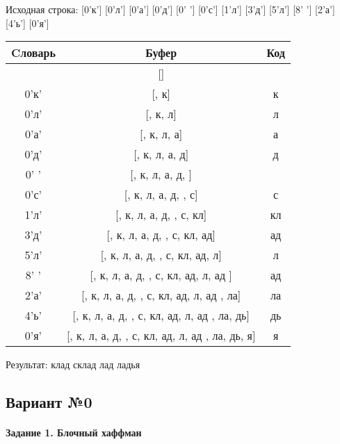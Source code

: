 \documentclass[a4paper, 12pt]{article}
\begin{document}
Исходная строка: [0'к'] [0'л'] [0'а'] [0'д'] [0' '] [0'с'] [1'л'] [3'д'] [5'л'] [8' '] [2'а'] [4'ь'] [0'я']\\
\begin{table}[h!]
\centering
\begin{tabular}{|c|c|c|}
\hline
 Cловарь & Буфер & Код  \\ \hline
 & [] & 
\\ \hline
0'к' & [, к] & к
\\ \hline
0'л' & [, к, л] & л
\\ \hline
0'а' & [, к, л, а] & а
\\ \hline
0'д' & [, к, л, а, д] & д
\\ \hline
0' ' & [, к, л, а, д,  ] &  
\\ \hline
0'с' & [, к, л, а, д,  , с] & с
\\ \hline
1'л' & [, к, л, а, д,  , с, кл] & кл
\\ \hline
3'д' & [, к, л, а, д,  , с, кл, ад] & ад
\\ \hline
5'л' & [, к, л, а, д,  , с, кл, ад,  л] &  л
\\ \hline
8' ' & [, к, л, а, д,  , с, кл, ад,  л, ад ] & ад 
\\ \hline
2'а' & [, к, л, а, д,  , с, кл, ад,  л, ад , ла] & ла
\\ \hline
4'ь' & [, к, л, а, д,  , с, кл, ад,  л, ад , ла, дь] & дь
\\ \hline
0'я' & [, к, л, а, д,  , с, кл, ад,  л, ад , ла, дь, я] & я
\\ \hline
\end{tabular}
\end{table}

Результат: клад склад лад ладья
\pagebreak
\subsection{Вариант №0}
\paragraph{Задание 1. Блочный хаффман \\}
\end{document}

